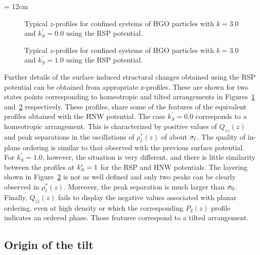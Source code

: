 \picW = 12cm
\begin{figure}
	\centering
	\caption{Typical $z$-profiles for confined systems of HGO particles with 
	$k=3.0$ and $k^{'}_S = 0.0$ using the RSP potential.}
	\label{fig:RSP_typeProf_k3_homeo}
\end{figure}

\begin{figure}
	\centering
	\caption{Typical $z$-profiles for confined systems of HGO particles with 
	$k=3.0$ and $k^{'}_S = 1.0$ using the RSP potential.}
	\label{fig:RSP_typeProf_k3_planar}
\end{figure}

Further details of the surface induced structural changes obtained using the RSP potential 
can be obtained from appropriate z-profiles. These are shown for two states points 
corresponding to homeotropic and tilted arrangements in 
Figures~\ref{fig:RSP_typeProf_k3_homeo} and~\ref{fig:RSP_typeProf_k3_planar} respectively.
These profiles, share some of the features of the equivalent profiles obtained with the HNW
potential.
The case $k^\prime_S = 0.0$ corresponds to a  homeotropic arrangement. This is characterized by
positive values of $Q_{zz}(z)$ and peak separations in the oscillations of $\rho^{*}_\ell(z)$ 
of about $\sigma_\ell$. The quality of in-plane ordering is similar to that observed with the previous
surface potential.\\
%
For $k^\prime_S = 1.0$, however, the situation is very different, and there is little similarity 
between the profiles at $k_S^{\prime} = 1$ for the RSP and HNW potentials.
The layering shown in Figure~\ref{fig:RSP_typeProf_k3_planar} is not as well defined and only 
two peaks  can  be clearly observed in $\rho^{*}_\ell(z)$. Moreover, the peak separation is much 
larger than $\sigma_0$.  Finally, $Q_{zz}(z)$ fails to display the negative values associated with 
planar ordering,  even at high density or which the corresponding $P_2(z)$ profile indicates 
an ordered phase. Those features correspond to a tilted arrangement.\\
%
%



\subsection{Origin of the tilt}


